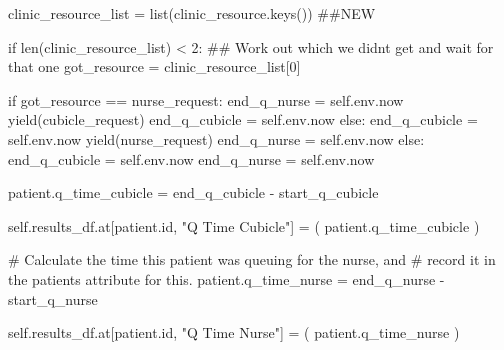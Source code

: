 \documentclass[
  letterpaper,
  DIV=11,
  numbers=noendperiod]{scrreprt}
\newenvironment{Shaded}{\begin{snugshade}}{\end{snugshade}}
\newcommand{\BuiltInTok}[1]{\textcolor[rgb]{0.00,0.23,0.31}{#1}}
\newcommand{\CommentTok}[1]{\textcolor[rgb]{0.37,0.37,0.37}{#1}}
\newcommand{\ControlFlowTok}[1]{\textcolor[rgb]{0.00,0.23,0.31}{#1}}
\newcommand{\DecValTok}[1]{\textcolor[rgb]{0.68,0.00,0.00}{#1}}
\newcommand{\NormalTok}[1]{\textcolor[rgb]{0.00,0.23,0.31}{#1}}
\newcommand{\OperatorTok}[1]{\textcolor[rgb]{0.37,0.37,0.37}{#1}}
\newcommand{\StringTok}[1]{\textcolor[rgb]{0.13,0.47,0.30}{#1}}
\newcommand{\VariableTok}[1]{\textcolor[rgb]{0.07,0.07,0.07}{#1}}
\begin{document}
\begin{Shaded}
\begin{Highlighting}[]
\NormalTok{clinic\_resource\_list }\OperatorTok{=} \BuiltInTok{list}\NormalTok{(clinic\_resource.keys()) }\CommentTok{\#\#NEW}

\ControlFlowTok{if} \BuiltInTok{len}\NormalTok{(clinic\_resource\_list) }\OperatorTok{\textless{}} \DecValTok{2}\NormalTok{:}
    \CommentTok{\#\# Work out which we didn\textquotesingle{}t get and wait for that one}
\NormalTok{    got\_resource }\OperatorTok{=}\NormalTok{ clinic\_resource\_list[}\DecValTok{0}\NormalTok{]}

    \ControlFlowTok{if}\NormalTok{ got\_resource }\OperatorTok{==}\NormalTok{ nurse\_request:}
\NormalTok{        end\_q\_nurse }\OperatorTok{=} \VariableTok{self}\NormalTok{.env.now}
        \ControlFlowTok{yield}\NormalTok{(cubicle\_request)}
\NormalTok{        end\_q\_cubicle }\OperatorTok{=} \VariableTok{self}\NormalTok{.env.now}
    \ControlFlowTok{else}\NormalTok{:}
\NormalTok{        end\_q\_cubicle }\OperatorTok{=} \VariableTok{self}\NormalTok{.env.now}
        \ControlFlowTok{yield}\NormalTok{(nurse\_request)}
\NormalTok{        end\_q\_nurse }\OperatorTok{=} \VariableTok{self}\NormalTok{.env.now}
\ControlFlowTok{else}\NormalTok{:}
\NormalTok{    end\_q\_cubicle }\OperatorTok{=} \VariableTok{self}\NormalTok{.env.now}
\NormalTok{    end\_q\_nurse }\OperatorTok{=} \VariableTok{self}\NormalTok{.env.now}

\NormalTok{patient.q\_time\_cubicle }\OperatorTok{=}\NormalTok{ end\_q\_cubicle }\OperatorTok{{-}}\NormalTok{ start\_q\_cubicle}

\VariableTok{self}\NormalTok{.results\_df.at[patient.}\BuiltInTok{id}\NormalTok{, }\StringTok{"Q Time Cubicle"}\NormalTok{] }\OperatorTok{=}\NormalTok{ (}
\NormalTok{      patient.q\_time\_cubicle}
\NormalTok{)}

\CommentTok{\# Calculate the time this patient was queuing for the nurse, and}
\CommentTok{\# record it in the patient\textquotesingle{}s attribute for this.}
\NormalTok{patient.q\_time\_nurse }\OperatorTok{=}\NormalTok{ end\_q\_nurse }\OperatorTok{{-}}\NormalTok{ start\_q\_nurse}

\VariableTok{self}\NormalTok{.results\_df.at[patient.}\BuiltInTok{id}\NormalTok{, }\StringTok{"Q Time Nurse"}\NormalTok{] }\OperatorTok{=}\NormalTok{ (}
\NormalTok{  patient.q\_time\_nurse}
\NormalTok{)}
\end{Highlighting}
\end{Shaded}
\end{document}
